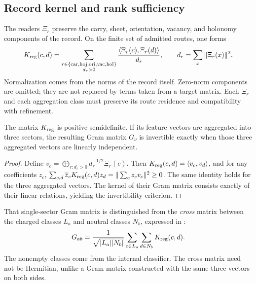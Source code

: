 \subsection{Record kernel and rank sufficiency}

The readers \(\Xi_r\) preserve the carry, sheet,
orientation, vacancy, and holonomy components of the record. On the finite set
of admitted routes, one forms
\begin{equation}
 K_{\rm reg}(c,d)=
 \sum_{\substack{r\in\{\mathrm{car},\mathrm{hoj},\mathrm{ori},
                           \mathrm{vac},\mathrm{hol}\}\\ d_r>0}}
 \frac{\langle\Xi_r(c),\Xi_r(d)\rangle}{d_r},
 \qquad
 d_r=\sum_x\|\Xi_r(x)\|^2.
 \label{eq:ii-reg-kernel}
\end{equation}
Normalization comes from the norms of the record itself.
Zero-norm components are omitted; they are not replaced by terms taken
from a target matrix. Each \(\Xi_r\) and each aggregation class must
preserve its route residence and compatibility with refinement.

\begin{proposition}
The matrix \(K_{\rm reg}\) is positive semidefinite. If its
feature vectors are aggregated into three sectors, the resulting Gram
matrix \(G_\nu\) is invertible exactly when those three aggregated
vectors are linearly independent.
\end{proposition}

\begin{proof}
Define
\(v_c=\bigoplus_{r:d_r>0}d_r^{-1/2}\Xi_r(c)\).
Then \(K_{\rm reg}(c,d)=\langle v_c,v_d\rangle\), and for
any coefficients \(z_c\),
\(\sum_{c,d}\overline z_cK_{\rm reg}(c,d)z_d
=\|\sum_c z_cv_c\|^2\ge0\).
The same identity holds for the three aggregated vectors.
The kernel of their Gram matrix consists exactly of their linear
relations, yielding the invertibility criterion.
\end{proof}

That single-sector Gram matrix is distinguished from the \emph{cross} matrix between the
charged classes \(L_a\) and neutral classes \(N_b\), expressed in \cite{mezcla}:
\begin{equation}
 G_{ab}=\frac1{\sqrt{|L_a||N_b|}}
       \sum_{c\in L_a}\sum_{d\in N_b}K_{\rm reg}(c,d).
 \label{eq:ii-cross-gram}
\end{equation}
The nonempty classes come from the internal classifier. The cross matrix
need not be Hermitian, unlike a Gram matrix constructed with
the same three vectors on both sides.

